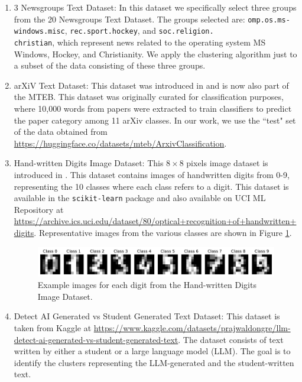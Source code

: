 \documentclass{article}
\begin{document}
\begin{enumerate}
    \item 3 Newsgroups Text Dataset: In this dataset we specifically select three groups from the 20 Newsgroups Text Dataset. The groups selected are: \texttt{omp.os.ms-windows.misc}, \texttt{rec.sport.hockey}, and \texttt{soc.religion.\\christian}, which represent news related to the operating system MS Windows, Hockey, and Christianity. We apply the clustering algorithm just to a subset of the data consisting of these three groups. 

    \item arXiV Text Dataset: This dataset was introduced in \cite{8675939} and is now also part of the MTEB. This dataset was originally curated for classification purposes, where 10,000 words from papers were extracted to train classifiers to predict the paper category among 11 arXiv classes. In our work, we use the ``test" set of the data obtained from \url{https://huggingface.co/datasets/mteb/ArxivClassification}. 

    \item Hand-written Digits Image Dataset: This $8 \times 8$ pixels image dataset is introduced in \cite{kaynak1995methods}. This dataset contains images of handwritten digits from 0-9, representing the 10 classes where each class refers to a digit. This dataset is available in the \texttt{scikit-learn} package and also available on UCI ML Repository at \url{https://archive.ics.uci.edu/dataset/80/optical+recognition+of+handwritten+digits}. Representative images from the various classes are shown in Figure \ref{fig:digits}. 

    \begin{figure}[H]
        \centering
        \includegraphics[width=\linewidth]{images/digits_classes.pdf}
        \caption{Example images for each digit from the Hand-written Digits Image Dataset.}
        \label{fig:digits}
    \end{figure}

    \item Detect AI Generated vs Student Generated Text Dataset: This dataset is taken from Kaggle at \url{https://www.kaggle.com/datasets/prajwaldongre/llm-detect-ai-generated-vs-student-generated-text}. The dataset consists of text written by either a student or a large language model (LLM). The goal is to identify the clusters representing the LLM-generated and the student-written text. 

\end{enumerate}
\end{document}
